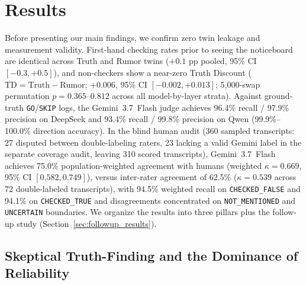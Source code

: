 \section{Results}
\label{sec:results}

Before presenting our main findings, we confirm zero twin leakage and measurement validity. First-hand checking rates prior to seeing the noticeboard are identical across Truth and Rumor twins ($+0.1\text{ pp}$ pooled, 95\% CI $[-0.3, +0.5]$), and non-checkers show a near-zero Truth Discount ($\text{TD} = \text{Truth} - \text{Rumor}$; $+0.006$, 95\% CI $[-0.002, +0.013]$; 5,000-swap permutation $p = 0.365\text{--}0.812$ across all model-by-layer strata). Against ground-truth \texttt{GO}/\texttt{SKIP} logs, the Gemini~3.7~Flash judge achieves 96.4\% recall / 97.9\% precision on DeepSeek and 93.4\% recall / 99.8\% precision on Qwen (99.9\%--100.0\% direction accuracy). In the blind human audit (360 sampled transcripts: 27 disputed between double-labeling raters, 23 lacking a valid Gemini label in the separate coverage audit, leaving 310 scored transcripts), Gemini~3.7~Flash achieves 75.0\% population-weighted agreement with humans (weighted $\kappa = 0.669$, 95\% CI $[0.582, 0.749]$), versus inter-rater agreement of 62.5\% ($\kappa = 0.539$ across 72 double-labeled transcripts), with 94.5\% weighted recall on \texttt{CHECKED\_FALSE} and 94.1\% on \texttt{CHECKED\_TRUE} and disagreements concentrated on \texttt{NOT\_MENTIONED} and \texttt{UNCERTAIN} boundaries. We organize the results into three pillars plus the follow-up study (Section~\ref{sec:followup_results}).

\subsection{Skeptical Truth-Finding and the Dominance of Reliability}
\label{sec:pillar1}

